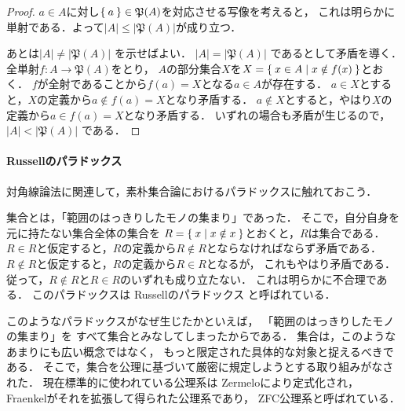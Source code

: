    \begin{proof}
     $a \in A$に対し$\Set{ a } \in \mathfrak{P}(A)$を対応させる写像を考えると，
     これは明らかに単射である．よって$\lvert A \rvert \leq 
     \left \lvert \mathfrak{P}(A) \right \rvert$が成り立つ．

     あとは$\lvert A \rvert \neq \left \lvert \mathfrak{P} (A) \right \rvert$
     を示せばよい．
     $\lvert A \rvert = \left \lvert \mathfrak{P}(A) \right \rvert$
     であるとして矛盾を導く．
     全単射$f: A \longrightarrow \mathfrak{P}(A)$をとり，
     $A$の部分集合$X$を$X = \Set{ x \in A \mid x \notin f(x)}$とおく．
     $f$が全射であることから$f(a) = X$となる$a \in A$が存在する．
     $a \in X$とすると，$X$の定義から$a \notin f(a) = X$となり矛盾する．
     $a \notin X$とすると，やはり$X$の定義から$a \in f(a) =X$となり矛盾する．
     いずれの場合も矛盾が生じるので，
     $\lvert A \rvert < \left \lvert \mathfrak{P}(A) \right \rvert$
     である．
   \end{proof}

  \paragraph{Russellのパラドックス}
   対角線論法に関連して，素朴集合論におけるパラドックスに触れておこう．

   集合とは，「範囲のはっきりしたモノの集まり」であった．
   そこで，自分自身を元に持たない集合全体の集合を
   $R= \Set{ x \mid x \notin x}$とおくと，$R$は集合である．
   $R \in R$と仮定すると，$R$の定義から$R \notin R$とならなければならず矛盾である．
   $R \notin R$と仮定すると，$R$の定義から$R \in R$となるが，
   これもやはり矛盾である．
   従って，$R \notin R$と$R \in R$のいずれも成り立たない．
   これは明らかに不合理である．
   このパラドックスは
   Russellのパラドックス
   と呼ばれている．

   このようなパラドックスがなぜ生じたかといえば，
   「範囲のはっきりしたモノの集まり」を
   すべて集合とみなしてしまったからである．
   集合は，このようなあまりにも広い概念ではなく，
   もっと限定された具体的な対象と捉えるべきである．
   そこで，集合を公理に基づいて厳密に規定しようとする取り組みがなされた．
   現在標準的に使われている公理系は
   Zermeloにより定式化され，
   Fraenkelがそれを拡張して得られた公理系であり，
   ZFC公理系と呼ばれている．


